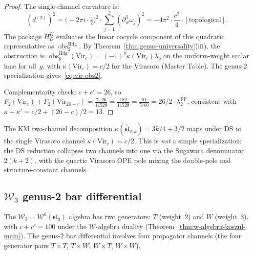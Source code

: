 \begin{proof}
The single-channel curvature is:
\[
(d^{(2)})^2 = \bigl(-2\pi i \cdot \tfrac{c}{2}\bigr)^2
\cdot \sum_{j=1}^{2} (\partial_w^3\omega_j)^2
= -4\pi^2 \cdot \frac{c^2}{4} \cdot [\text{topological}].
\]
The package $H_D^K$ evaluates the linear cocycle component of this
quadratic representative as
$\operatorname{obs}^{\mathrm{Hdg}}_2$. By
Theorem~\ref{thm:genus-universality}(iii), the obstruction is
$\operatorname{obs}^{\mathrm{Hdg}}_g(\mathrm{Vir}_c)
=(-1)^g\kappa(\mathrm{Vir}_c)\lambda_g$ on the uniform-weight
scalar lane for all~$g$, with
\(\kappa(\mathrm{Vir}_c)=c/2\) for the Virasoro (Master Table). The
genus-$2$ specialization gives~\eqref{eq:vir-obs2}.

Complementarity check: $c + c' = 26$, so
$F_2(\mathrm{Vir}_c) + F_2(\mathrm{Vir}_{26-c})
= \frac{7 \cdot 26}{11520} = \frac{182}{11520}
= \frac{91}{5760} = 26/2 \cdot \lambda_2^{\mathrm{FP}}$,
consistent with
$\kappa + \kappa' = c/2 + (26-c)/2 = 13$.
\end{proof}

\begin{remark}
\label{rem:virasoro-genus2-ds}
The KM two-channel decomposition $\kappa(\widehat{\mathfrak{sl}}_{2,k}) = 3k/4 + 3/2$ maps under DS to the single Virasoro channel $\kappa(\mathrm{Vir}_c) = c/2$. This is \emph{not} a simple specialization: the DS reduction collapses two channels into one via the Sugawara denominator $2(k+2)$, with the quartic Virasoro OPE pole mixing the double-pole and structure-constant channels.
\end{remark}

\subsection{\texorpdfstring{$\mathcal{W}_3$ genus-2 bar differential}{W3 genus-2 bar differential}}
\label{subsec:w3-genus2-bar}

The $\mathcal{W}_3 = \mathcal{W}^k(\mathfrak{sl}_3)$ algebra has
two generators: $T$ (weight~$2$) and $W$ (weight~$3$), with
$c + c' = 100$ under the $\mathcal{W}$-algebra duality
(Theorem~\ref{thm:w-algebra-koszul-main}). The genus-$2$ bar
differential involves four propagator channels (the four
generator pairs $T \times T$, $T \times W$, $W \times T$,
$W \times W$).

